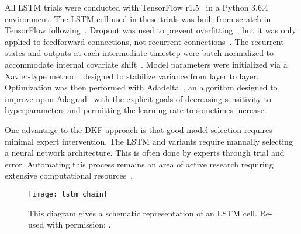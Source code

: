 All LSTM trials were conducted with TensorFlow r1.5~\cite{Aba15} in a Python 3.6.4 environment. The LSTM cell used in these trials was built from scratch in TensorFlow following~\cite{Ger00a}.  Dropout was used to prevent overfitting~\cite{Sri14}, but it was only applied to feedforward connections, not recurrent connections~\cite{Pha14, Zar14}.  The recurrent states and outputs at each intermediate timestep were batch-normalized to accommodate internal covariate shift~\cite{Iof15}.  
Model parameters were initialized via a Xavier-type method~\cite{Glo10} designed to stabilize variance from layer to layer.  Optimization was then performed with Adadelta~\cite{Zei12}, an algorithm designed to improve upon Adagrad~\cite{Duc11} with the explicit goals of decreasing sensitivity to hyperparameters and permitting the learning rate to sometimes increase.

One advantage to the DKF approach is that good model selection requires minimal expert intervention.  The LSTM and variants require manually selecting a neural network architecture.  This is often done by experts through trial and error.  Automating this process remains an area of active research requiring extensive computational resources~\cite{Zop17,Rea17}.  

\begin{figure}[h]
\texttt{[image: lstm\_chain]}
\caption[LSTM schematic]{This diagram gives a schematic representation of an LSTM cell.  Re-used with permission: \textcite{Ola15}.}
\end{figure}



